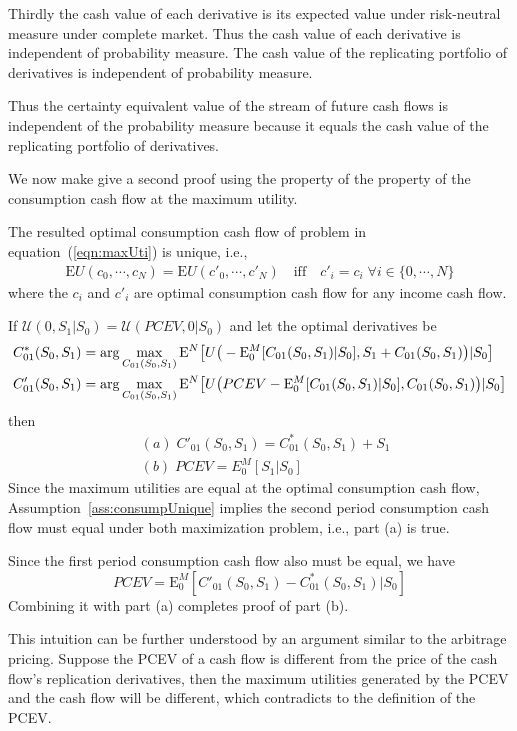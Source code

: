 \documentclass{article}[12pt letter]
\newcommand{\E}{\mathrm{E}}
\begin{document}
Thirdly the cash value of each derivative is its expected value under risk-neutral measure under complete market. Thus the cash value of each derivative is independent of probability measure. The cash value of the replicating portfolio of derivatives is independent of probability measure.

Thus the certainty equivalent value of the stream of future cash flows is independent of the probability measure because it equals the cash value of the replicating portfolio of derivatives. 

We now make give a second proof using the property of the property of the consumption cash flow at the maximum utility.

{\assumption \label{ass:consumpUnique} 
The resulted  optimal consumption cash flow of problem in equation~(\ref{eqn:maxUti}) is unique, i.e.,
\begin{align} 
\E U(c_0, \cdots, c_N)  = \E U(c'_0, \cdots, c'_N)  \quad  \mbox{iff} \quad c'_i = c_i \; \forall i \in \{0, \cdots, N \} 
\end{align}
where the $c_i$ and $c'_i$ are optimal consumption cash flow for any income cash flow. 
}

{\lemma If $\mathcal{U}(0,S_1|S_0) = \mathcal{U}(PCEV,0|S_0)$ and let the optimal derivatives  be
\begin{align}
C^*_{01}(S_0,S_1) &= \arg\max_{C_{01}(S_0,S_1)} \E^N\big{[} U\big{(}-\E^M_0[C_{01}(S_0,S_1)|S_0], S_1 + C_{01}(S_0,S_1) \big{)}|S_0\big{]}\\
C'_{01}(S_0,S_1) &= \arg\max_{C_{01}(S_0,S_1)} \E^N\big{[} U\big{(}PCEV-\E^M_0[C_{01}(S_0,S_1)|S_0], C_{01}(S_0,S_1) \big{)}|S_0\big{]}
\end{align}
then  
\begin{align}
& (a) \; C'_{01}(S_0,S_1) = C^*_{01}(S_0,S_1) + S_1 \\
& (b) \; PCEV = E_0^M[S_1|S_0]
\end{align}
}
\proof Since the maximum utilities are equal at the optimal consumption cash flow, Assumption~\ref{ass:consumpUnique} implies the second period consumption cash flow must equal under both maximization problem, i.e., part (a) is true.

Since the first period consumption cash flow also must be equal, we have
\[PCEV = \E_0^M[ C'_{01}(S_0,S_1) - C^*_{01}(S_0,S_1) |S_0] \]
Combining it with part (a) completes proof of part (b).
\endproof




This intuition can be further understood by an argument similar to the arbitrage pricing. Suppose the PCEV of a cash flow is different from the price of the cash flow's replication derivatives, then the maximum utilities generated by the PCEV and the cash flow will be different, which contradicts to the definition of the PCEV. 
\end{document}
